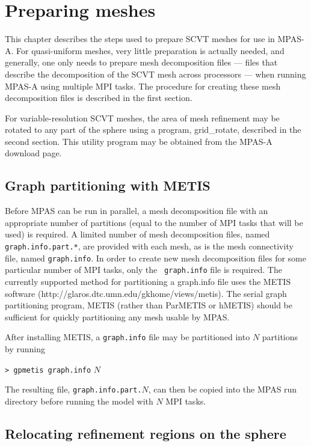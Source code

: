 \chapter{Preparing meshes}
\label{chap:mpas_grid_preparation}

This chapter describes the steps used to prepare SCVT meshes for use in MPAS-A.
For quasi-uniform meshes, very little preparation is actually needed, and
generally, one only needs to prepare mesh decomposition files --- files that
describe the decomposition of the SCVT mesh across processors --- when running
MPAS-A using multiple MPI tasks. The procedure for creating these mesh
decomposition files is described in the first section. 

For variable-resolution SCVT meshes, the area of mesh refinement may be rotated
to any part of the sphere using a program, grid\_rotate, described in the second
section. This utility program may be obtained from the MPAS-A download page.
\section{Graph partitioning with METIS} 
\label{sec:metis}

Before MPAS can be run in parallel, a mesh decomposition file with an
appropriate number of partitions (equal to the number of MPI tasks that will be
used) is required. A limited number of mesh decomposition files, named {\tt
graph.info.part.*}, are provided with each mesh, as is the mesh
connectivity file, named {\tt graph.info}. In order to create new mesh
decomposition files for some particular number of MPI tasks, only the {\tt
graph.info} file is required.  The currently supported method for partitioning
a graph.info file uses the METIS software
(http://glaros.dtc.umn.edu/gkhome/views/metis).  The serial graph partitioning
program, METIS (rather than ParMETIS or hMETIS) should be sufficient for
quickly partitioning any mesh usable by MPAS.

After installing METIS, a {\tt graph.info} file may be partitioned into $N$
partitions by running

\vspace{12pt}
{\tt > gpmetis graph.info} $N$
\vspace{12pt}

\noindent The resulting file, {\tt graph.info.part.}$N$, can then be copied into
the MPAS run directory before running the model with $N$ MPI tasks.


\section{Relocating refinement regions on the sphere}
\label{sec:grid_rotate} 

